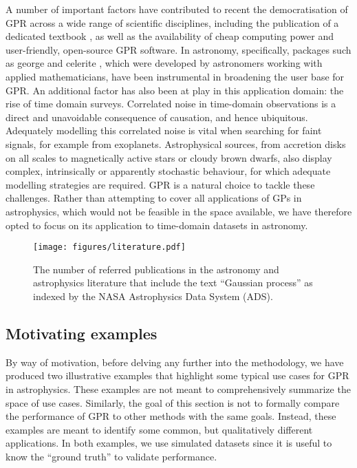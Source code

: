 \documentclass[letterpaper]{ar-1col}
\newcommand{\project}[1]{\textsf{#1}}
\begin{document}
A number of important factors have contributed to recent the democratisation of GPR across a wide range of scientific disciplines, including the publication of a dedicated textbook \citep{gpml}, as well as the availability of cheap computing power and user-friendly, open-source GPR software. In astronomy, specifically, packages such as \project{george} \citep{george} and \project{celerite} \citep{celerite}, which were developed by astronomers working with applied mathematicians, have been instrumental in broadening the user base for GPR. An additional factor has also been at play in this application domain: the rise of time domain surveys. Correlated noise in time-domain observations is a direct and unavoidable consequence of causation, and hence ubiquitous. Adequately modelling this correlated noise is vital when searching for faint signals, for example from exoplanets. Astrophysical sources, from accretion disks on all scales to magnetically active stars or cloudy brown dwarfs, also display complex, intrinsically or apparently stochastic behaviour, for which adequate modelling strategies are required. GPR is a natural choice to tackle these challenges. Rather than attempting to cover all applications of GPs in astrophysics, which would not be feasible in the space available, we have therefore opted to focus on its application to time-domain datasets in astronomy.

\begin{figure}[ht]
  \centering
  \texttt{[image: figures/literature.pdf]}
  \caption{The number of referred publications in the astronomy and astrophysics literature that include the text ``Gaussian process'' as indexed by the NASA Astrophysics Data System (ADS). }
  \label{fig:literature}
\end{figure}

\subsection{Motivating examples}
\label{sec:sim_examples}

By way of motivation, before delving any further into the methodology, we have produced two illustrative examples that highlight some typical use cases for GPR in astrophysics.
These examples are not meant to comprehensively summarize the space of use cases.
Similarly, the goal of this section is not to formally compare the performance of GPR to other methods with the same goals.
Instead, these examples are meant to identify some common, but qualitatively different applications.
In both examples, we use simulated datasets since it is useful to know the ``ground truth'' to validate performance.
\end{document}
